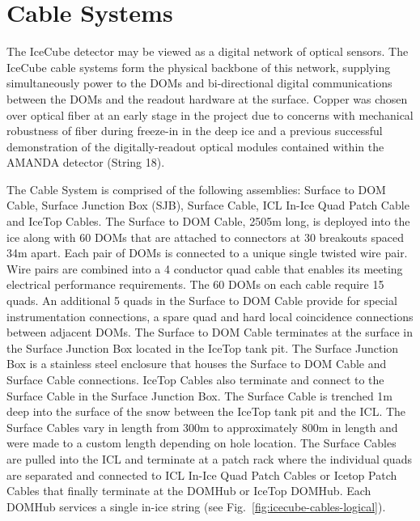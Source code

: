 
 
\section{Cable Systems}

The IceCube detector may be viewed as a digital network of optical
sensors. The IceCube cable systems form the physical backbone of this
network, supplying simultaneously power to the DOMs and bi-directional
digital communications between the DOMs and the readout hardware at the
surface. Copper was chosen over optical fiber at an early stage in the
project due to concerns with mechanical robustness of fiber during
freeze-in in the deep ice and a previous successful demonstration of the
digitally-readout optical modules contained within the AMANDA detector
(String 18).

The Cable System is comprised of the following assemblies: Surface to DOM
Cable, Surface Junction Box (SJB), Surface Cable, ICL In-Ice Quad Patch
Cable and IceTop Cables. The Surface to DOM Cable, 2505m long, is deployed
into the ice along with 60 DOMs that are attached to connectors at 30
breakouts spaced 34m apart. Each pair of DOMs is connected to a unique
single twisted wire pair. Wire pairs are combined into a 4 conductor quad
cable that enables its meeting electrical performance requirements. The 60
DOMs on each cable require 15 quads. An additional 5 quads in the Surface
to DOM Cable provide for special instrumentation connections, a spare quad
and hard local coincidence connections between adjacent DOMs. The Surface
to DOM Cable terminates at the surface in the Surface Junction Box located
in the IceTop tank pit. The Surface Junction Box is a stainless steel
enclosure that houses the Surface to DOM Cable and Surface Cable
connections. IceTop Cables also terminate and connect to the Surface Cable
in the Surface Junction Box. The Surface Cable is trenched 1m deep into the
surface of the snow between the IceTop tank pit and the ICL. The Surface
Cables vary in length from 300m to approximately 800m in length and were
made to a custom length depending on hole location. The Surface Cables are
pulled into the ICL and terminate at a patch rack where the individual
quads are separated and connected to ICL In-Ice Quad Patch Cables or Icetop
Patch Cables that finally terminate at the DOMHub or IceTop DOMHub. Each
DOMHub services a single in-ice string (see
Fig.~\ref{fig:icecube-cables-logical}). 

